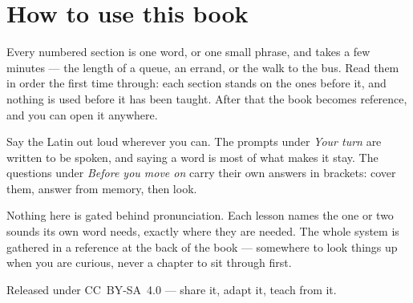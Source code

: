 \documentclass[11pt,twoside]{book}
\begin{document}
\section*{How to use this book}

Every numbered section is one word, or one small phrase, and takes a few
minutes --- the length of a queue, an errand, or the walk to the bus. Read them
in order the first time through: each section stands on the ones before it, and
nothing is used before it has been taught. After that the book becomes
reference, and you can open it anywhere.

Say the Latin out loud wherever you can. The prompts under \emph{Your turn}
are written to be spoken, and saying a word is most of what makes it stay. The
questions under \emph{Before you move on} carry their own answers in brackets:
cover them, answer from memory, then look.

Nothing here is gated behind pronunciation. Each lesson names the one or two
sounds its own word needs, exactly where they are needed. The whole system is
gathered in a reference at the back of the book --- somewhere to look things up
when you are curious, never a chapter to sit through first.

Released under CC~BY-SA~4.0 --- share it, adapt it, teach from it.

\tableofcontents

\mainmatter



















































\backmatter






\end{document}

